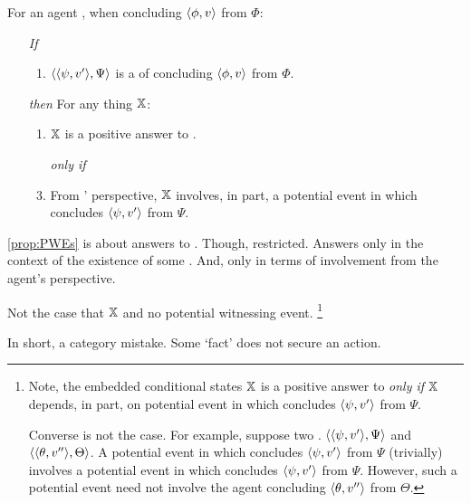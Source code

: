 \begin{note}
  \begin{proposition}
    \label{prop:PWEs}
    For an agent \vAgent{}, when concluding \(\pv{\phi}{v}\) from \(\Phi\):
    \begin{itemize}
    \item[\emph{If}]
      \begin{enumerate}[label=\alph*.]
      \item
        \(\pvp{\psi}{v'}{\Psi}\) is a \requ{} of \vAgent{} concluding \(\pv{\phi}{v}\) from \(\Phi\).
      \end{enumerate}
    \item[\emph{then}]
      For any thing \(\qzSaV{}\):
      \begin{enumerate}[label=\alph*., resume]
      \item
        \(\qzSaV{}\) is a positive answer to \qzS{}.
      \item[\emph{only if}]
      \item
        From \vAgent{}' perspective, \(\qzSaV{}\) involves, in part, a potential event in which \vAgent{} concludes \(\pv{\psi}{v'}\) from \(\Psi\).
      \end{enumerate}
    \end{itemize}
  \end{proposition}

  \autoref{prop:PWEs} is about answers to \qzS{}.
  Though, restricted.
  Answers only in the context of the existence of some \requ{}.
  And, only in terms of involvement from the agent's perspective.

  Not the case that \(\qzSaV{}\) and no potential witnessing event.
  \footnote{
    Note, the embedded conditional states \(\qzSaV{}\) is a positive answer to \qzS{} \emph{only if} \(\qzSaV{}\) depends, in part, on potential event in which \vAgent{} concludes \(\pv{\psi}{v'}\) from \(\Psi\).

    Converse is not the case.
    For example, suppose two .
    \(\pvp{\psi}{v'}{\Psi}\) and \(\pvp{\theta}{v''}{\Theta}\).
    A potential event in which \vAgent{} concludes \(\pv{\psi}{v'}\) from \(\Psi\) (trivially) involves a potential event in which \vAgent{} concludes \(\pv{\psi}{v'}\) from \(\Psi\).
    However, such a potential event need not involve the agent concluding \(\pv{\theta}{v''}\) from \(\Theta\).
  }
\end{note}

\begin{note}
  In short, a category mistake.
  Some `fact' does not secure an action.
\end{note}

